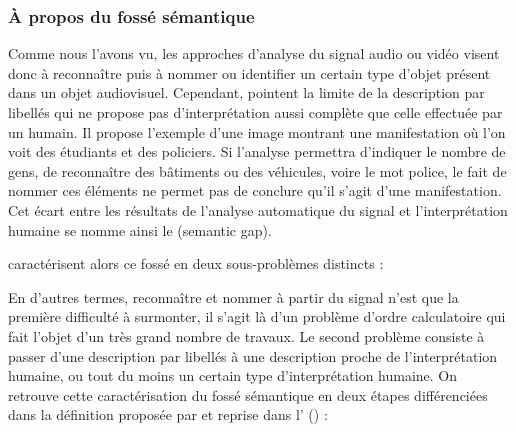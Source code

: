 

\subsubsection{À propos du fossé sémantique}
Comme nous l'avons vu, les approches d'analyse du signal audio ou vidéo visent donc à reconnaître puis à nommer ou identifier un certain type d'objet présent dans un objet audiovisuel. 
Cependant, \cite{hare:semantic-gap} pointent la limite de la description par libellés qui ne propose pas d'interprétation aussi complète que celle effectuée par un humain. 
Il propose l'exemple d'une image montrant une manifestation où l'on voit des étudiants et des policiers. 
Si l'analyse permettra d'indiquer le nombre de gens, de reconnaître des bâtiments ou des véhicules, voire le mot police, le fait de nommer ces éléments ne permet pas de conclure qu'il s'agit d'une manifestation. 
Cet écart entre les résultats de l'analyse automatique du signal et l'interprétation humaine se nomme ainsi le  (semantic gap). 


\citeauthor{hare:semantic-gap} caractérisent alors ce fossé en deux sous-problèmes distincts : 


En d'autres termes, reconnaître et nommer à partir du signal n'est que la première difficulté à surmonter, il s'agit là d'un problème d'ordre calculatoire qui fait l'objet d'un très grand nombre de travaux.
Le second problème consiste à passer d'une description par libellés à une description proche de l'interprétation humaine, ou tout du moins un certain type d'interprétation humaine. 
On retrouve cette caractérisation du fossé sémantique en deux étapes différenciées dans la définition proposée par \cite{Smeulders2000} et reprise dans l' (\cite{Furht2008}) :  %


